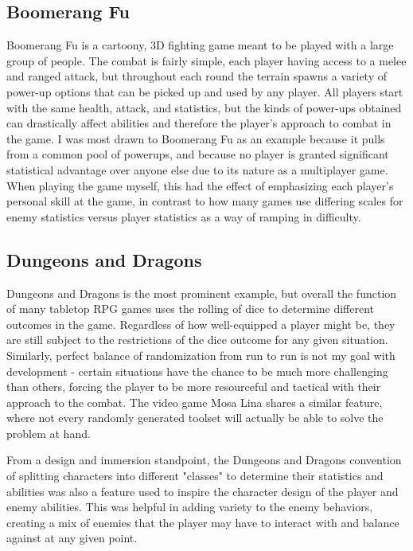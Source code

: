 \documentclass[10pt,twocolumn]{article}
\begin{document}
\subsection {Boomerang Fu}
Boomerang Fu is a cartoony, 3D fighting game meant to be played with a large group of people. The combat is fairly simple, each player having access to a melee and ranged attack, but throughout each round the terrain spawns a variety of power-up options that can be picked up and used by any player. All players start with the same health, attack, and statistics, but the kinds of power-ups obtained can drastically affect abilities and therefore the player's approach to combat in the game. I was most drawn to Boomerang Fu as an example because it pulls from a common pool of powerups, and because no player is granted significant statistical advantage over anyone else due to its nature as a multiplayer game. When playing the game myself, this had the effect of emphasizing each player's personal skill at the game, in contrast to how many games use differing scales for enemy statistics versus player statistics as a way of ramping in difficulty. \cite{boomerang}

\subsection {Dungeons and Dragons}
Dungeons and Dragons is the most prominent example, but overall the function of many tabletop RPG games uses the rolling of dice to determine different outcomes in the game. Regardless of how well-equipped a player might be, they are still subject to the restrictions of the dice outcome for any given situation. Similarly, perfect balance of randomization from run to run is not my goal with development - certain situations have the chance to be much more challenging than others, forcing the player to be more resourceful and tactical with their approach to the combat. The video game Mosa Lina \cite{mosa} shares a similar feature, where not every randomly generated toolset will actually be able to solve the problem at hand.

From a design and immersion standpoint, the Dungeons and Dragons convention of splitting characters into different "classes" to determine their statistics and abilities was also a feature used to inspire the character design of the player and enemy abilities. This was helpful in adding variety to the enemy behaviors, creating a mix of enemies that the player may have to interact with and balance against at any given point. \cite{dnd}
\end{document}

